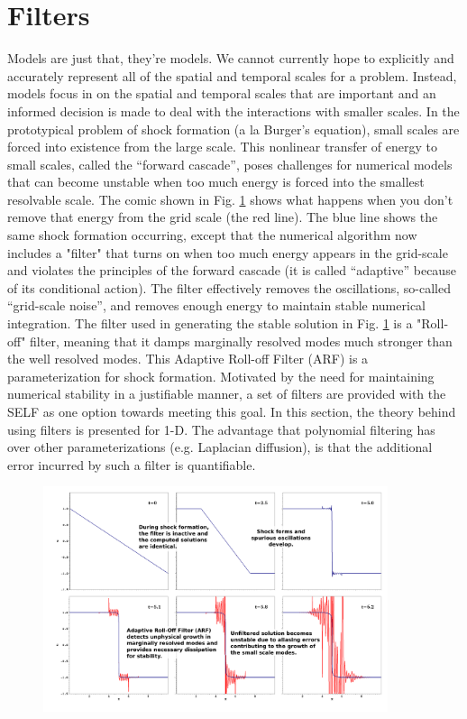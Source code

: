 \documentclass[12pt]{softwaremanual}
\begin{document}
\section{Filters}
Models are just that, they're models. We cannot currently hope to explicitly and accurately represent all of the spatial and temporal scales for a problem. Instead, models focus in on the spatial and temporal scales that are important and an informed decision is made to deal with the interactions with smaller scales. In the prototypical problem of shock formation (a la Burger's equation), small scales are forced into existence from the large scale. This nonlinear transfer of energy to small scales, called the ``forward cascade'', poses challenges for numerical models that can become unstable when too much energy is forced into the smallest resolvable scale. The comic shown in Fig. \ref{fig:shockFormation} shows what happens when you don't remove that energy from the grid scale (the red line). The blue line shows the same shock formation occurring, except that the numerical algorithm now includes a "filter" that turns on when too much energy appears in the grid-scale and violates the principles of the forward cascade (it is called ``adaptive'' because of its conditional action). The filter effectively removes the oscillations, so-called ``grid-scale noise'', and removes enough energy to maintain stable numerical integration. The filter used in generating the stable solution in Fig. \ref{fig:shockFormation} is a "Roll-off" filter, meaning that it damps marginally resolved modes much stronger than the well resolved modes. This Adaptive Roll-off Filter (ARF) is a parameterization for shock formation. Motivated by the need for maintaining numerical stability in a justifiable manner, a set of filters are provided with the SELF as one option towards meeting this goal. In this section, the theory behind using filters is presented for 1-D. The advantage that polynomial filtering has over other parameterizations (e.g. Laplacian diffusion), is that the additional error incurred by such a filter is quantifiable.

\begin{figure}
\begin{center}
\includegraphics[width=0.9\textwidth]{figures/filters/burger1d-ARF15h10l/Comic-FilterDemo.png}
\caption{}\label{fig:shockFormation}
\end{center}
\end{figure}
\end{document}
